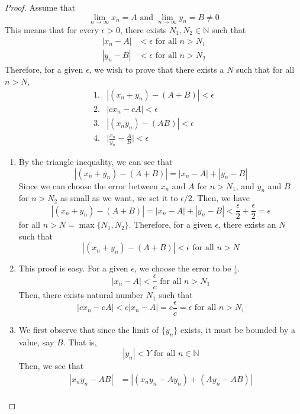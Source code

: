 \documentclass{article}
\begin{document}
      \begin{proof}
        Assume that 
        \[\lim_{n \rightarrow \infty} x_n = A \text{ and } \lim_{n \rightarrow \infty} y_n = B \neq 0\]
        This means that for every $\epsilon > 0$, there exists $N_1, N_2 \in \mathbb{N}$ such that
        \begin{align*}
            |x_n - A| &< \epsilon \text{ for all } n > N_1 \\
            |y_n - B| &< \epsilon \text{ for all } n > N_2
        \end{align*}
        Therefore, for a given $\epsilon$, we wish to prove that there exists a $N$ such that for all $n > N$, 
        \begin{align*}
            1. & |(x_n + y_n) - (A+B)| < \epsilon \\
            2. & |c x_n - cA| < \epsilon \\
            3. & |(x_n y_n) - (AB)| < \epsilon \\
            4. & \bigg| \frac{x_n}{y_n} - \frac{A}{B} \bigg| < \epsilon
        \end{align*}
        \begin{enumerate}
          \item By the triangle inequality, we can see that
          \[|(x_n + y_n) - (A+B)| = |x_n - A| + |y_n - B| \]
          Since we can choose the error between $x_n$ and $A$ for $n > N_1$, and $y_n$ and $B$ for $n>N_2$ as small as we want, we set it to $\epsilon/2$. Then, we have
          \[|(x_n + y_n) - (A+B)| = |x_n - A| + |y_n - B| < \frac{\epsilon}{2} + \frac{\epsilon}{2} = \epsilon\]
          for all $n> N = \max\{N_1, N_2\}$. Therefore, for a given $\epsilon$, there exists an $N$ such that 
          \[|(x_n + y_n) - (A+B)| < \epsilon \text{ for all } n > N\]
          \item This proof is easy. For a given $\epsilon$, we choose the error to be $\frac{\epsilon}{c}$.
          \[|x_n - A| < \frac{\epsilon}{c} \text{ for all } n >N_1\]
          Then, there exists natural number $N_1$ such that
          \[|c x_n - c A| < c |x_n - A| =  c \frac{\epsilon}{c} = \epsilon \text{ for all } n > N_1\]
          \item We first observe that since the limit of $\{y_n\}$ exists, it must be bounded by a value, say $B$. That is, 
          \[|y_n| < Y \text{ for all } n \in \mathbb{N}\]
          Then, we see that
          \begin{align*}
              |x_n y_n - AB| & = |(x_n y_n - Ay_n) + (Ay_n - AB)| \\

\end{align*}
\end{enumerate}
\end{proof}
\end{document}
